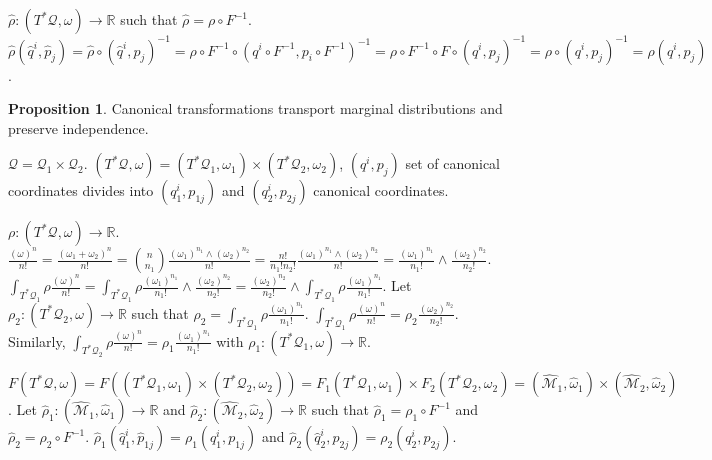 \documentclass[smallextended]{svjour3}
\numberwithin{equation}{section}
\theoremstyle{definition}
\newtheorem{prop}[equation]{Proposition}
\begin{document}
$\hat{\rho} : (T^*\mathcal{Q}, \omega) \rightarrow \mathbb{R}$ such that $\hat{\rho} = \rho \circ F^{-1 }$. $\hat{\rho}(\hat{q}^i, \hat{p}_j) = \hat{\rho} \circ (\hat{q}^i, \hat{p}_j)^{-1} = \rho \circ F^{-1} \circ (q^i \circ F^{-1}, p_i \circ F^{-1}) ^ {-1}= \rho \circ F^{-1} \circ F \circ (q^i, p_j) ^ {-1} = \rho \circ (q^i, p_j) ^ {-1} = \rho (q^i, p_j)$.

\begin{prop}
	Canonical transformations transport marginal distributions and preserve independence.
\end{prop}

$\mathcal{Q} = \mathcal{Q}_1 \times \mathcal{Q}_2$. $(T^*\mathcal{Q}, \omega)= (T^*\mathcal{Q}_1, \omega_1) \times (T^*\mathcal{Q}_2, \omega_2)$, $(q^i, p_j)$ set of canonical coordinates divides into $(q_1^i, p_{1j})$ and $(q_2^i, p_{2j})$ canonical coordinates.

$\rho : (T^*\mathcal{Q}, \omega) \rightarrow \mathbb{R}$. $\frac{(\omega)^n}{n!} = \frac{(\omega_1 + \omega_2)^n}{n!} = {n \choose n_1} \frac{(\omega_1)^{n_1} \wedge (\omega_2)^{n_2}}{n!} = \frac{n!}{n_1!n_2!}\frac{(\omega_1)^{n_1} \wedge (\omega_2)^{n_2}}{n!} = \frac{(\omega_1)^{n_1}}{n_1!} \wedge \frac{(\omega_2)^{n_2}}{n_2!} $. $\int_{T^*\mathcal{Q_1}}\rho \frac{(\omega)^n}{n!} = \int_{T^*\mathcal{Q_1}}\rho \frac{(\omega_1)^{n_1}}{n_1!} \wedge \frac{(\omega_2)^{n_2}}{n_2!} = \frac{(\omega_2)^{n_2}}{n_2!} \wedge \int_{T^*\mathcal{Q_1}}\rho \frac{(\omega_1)^{n_1}}{n_1!}$. Let $\rho_2 : (T^*\mathcal{Q}_2, \omega) \rightarrow \mathbb{R}$ such that $\rho_2 = \int_{T^*\mathcal{Q_1}}\rho \frac{(\omega_1)^{n_1}}{n_1!}$. $\int_{T^*\mathcal{Q_1}}\rho \frac{(\omega)^n}{n!} = \rho_2 \frac{(\omega_2)^{n_2}}{n_2!}$. Similarly, $\int_{T^*\mathcal{Q_2}}\rho \frac{(\omega)^n}{n!} = \rho_1 \frac{(\omega_1)^{n_1}}{n_1!}$ with $\rho_1 : (T^*\mathcal{Q}_1, \omega) \rightarrow \mathbb{R}$.

$F(T^*\mathcal{Q}, \omega) = F((T^*\mathcal{Q}_1, \omega_1) \times (T^*\mathcal{Q}_2, \omega_2)) = F_1(T^*\mathcal{Q}_1, \omega_1) \times F_2(T^*\mathcal{Q}_2, \omega_2) = (\hat{\mathcal{M}}_1, \hat{\omega}_1) \times (\hat{\mathcal{M}}_2, \hat{\omega}_2)$.
Let $\hat{\rho}_1 : (\hat{\mathcal{M}}_1, \hat{\omega}_1) \rightarrow \mathbb{R}$ and $\hat{\rho}_2 : (\hat{\mathcal{M}}_2, \hat{\omega}_2) \rightarrow \mathbb{R}$ such that $\hat{\rho}_1 = \rho_1 \circ F^{-1 }$ and $\hat{\rho}_2 = \rho_2 \circ F^{-1 }$.  $\hat{\rho}_1(\hat{q}_1^i, \hat{p}_{1j})=\rho_1(q_1^i, p_{1j})$ and $\hat{\rho}_2(\hat{q}_2^i, \hat{p}_{2j})=\rho_2(q_2^i, p_{2j})$.
\end{document}
